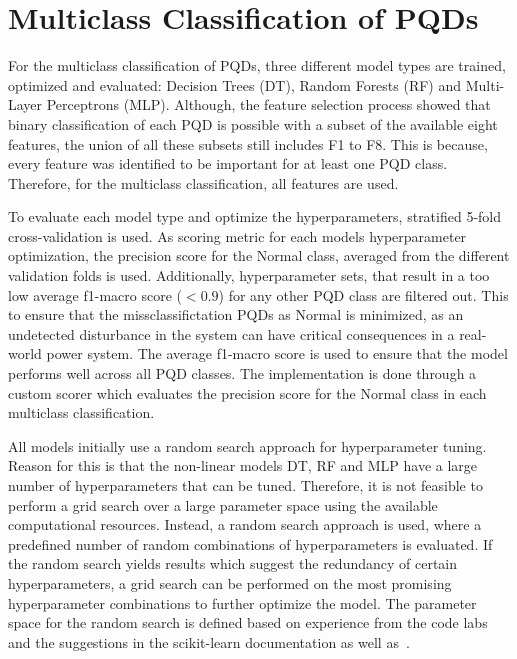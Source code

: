 \section{Multiclass Classification of PQDs}
For the multiclass classification of PQDs, three different model types are trained, optimized and evaluated: Decision Trees (DT), Random Forests (RF) and Multi-Layer Perceptrons (MLP). Although, the feature selection process showed that binary classification of each PQD is possible with a subset of the available eight features, the union of all these subsets still includes F1 to F8. This is because, every feature was identified to be important for at least one PQD class. Therefore, for the multiclass classification, all features are used.

To evaluate each model type and optimize the hyperparameters, stratified 5-fold cross-validation is used. As scoring metric for each models hyperparameter optimization, the precision score for the Normal class, averaged from the different validation folds is used. Additionally, hyperparameter sets, that result in a too low average f1-macro score ($<0.9$) for any other PQD class are filtered out. This to ensure that the missclassifictation PQDs as Normal is minimized, as an undetected disturbance in the system can have critical consequences in a real-world power system. The average f1-macro score is used to ensure that the model performs well across all PQD classes. The implementation is done through a custom scorer which evaluates the precision score for the Normal class in each multiclass classification.

All models initially use a random search approach for hyperparameter tuning. Reason for this is that the non-linear models DT, RF and MLP have a large number of hyperparameters that can be tuned. Therefore, it is not feasible to perform a grid search over a large parameter space using the available computational resources. Instead, a random search approach is used, where a predefined number of random combinations of hyperparameters is evaluated. If the random search yields results which suggest the redundancy of certain hyperparameters, a grid search can be performed on the most promising hyperparameter combinations to further optimize the model. The parameter space for the random search is defined based on experience from the code labs and the suggestions in the scikit-learn documentation as well as~\cite{ML_Refined_book}. 


